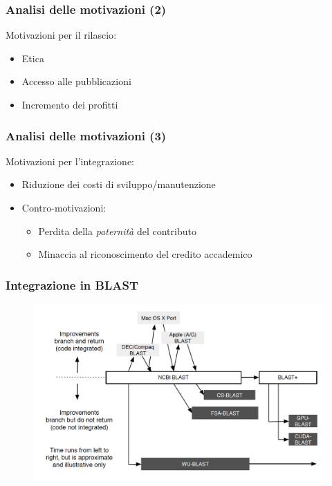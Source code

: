 \begin{frame}\frametitle{Analisi delle motivazioni (2)}

Motivazioni per il \alert{rilascio}:

\begin{itemize}[<+->]
\itemsep1pt\parskip0pt
\item
  Etica
\item
  Accesso alle pubblicazioni
\item
  Incremento dei profitti
\end{itemize}

\end{frame}

\begin{frame}\frametitle{Analisi delle motivazioni (3)}

Motivazioni per l'\alert{integrazione}:

\begin{itemize}[<+->]
\itemsep1pt\parskip0pt
\item
  Riduzione dei costi di sviluppo/manutenzione
\item
  \alert{Contro-motivazioni:}

  \begin{itemize}[<+->]
  \itemsep1pt\parskip0pt
  \item
    Perdita della \emph{paternità} del contributo
  \item
    Minaccia al riconoscimento del credito accademico
  \end{itemize}
\end{itemize}

\end{frame}

\begin{frame}\frametitle{Integrazione in BLAST}

\begin{figure}
\begin{center}
    \includegraphics[scale=.25]{img/integration_blast}
\end{center}
\end{figure}


\end{frame}

